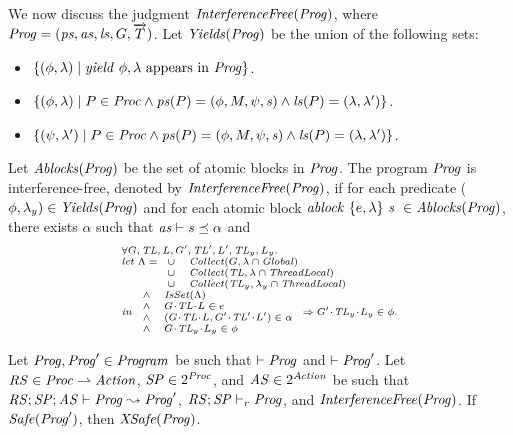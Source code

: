 We now discuss the judgment $\mathit{InterferenceFree}(\mathit{Prog})$,
where $\mathit{Prog} = (\mathit{ps}, \mathit{as}, \mathit{ls}, G, \overrightarrow{T})$. 
Let $\mathit{Yields}(\mathit{Prog})$ be the union of the following sets:
\begin{itemize}
\item
$\{(\phi,\lambda) \mid \mathit{yield}\ \phi,\lambda~\mathrm{appears~in~\mathit{Prog}}\}$.
\item
$\{(\phi,\lambda) \mid P \in \mathit{Proc} \wedge \mathit{ps}(P) = (\phi, M, \psi, \mathit{s}) \wedge \mathit{ls}(P) = (\lambda,\lambda')\}$.
\item
$\{(\psi,\lambda') \mid P \in \mathit{Proc} \wedge \mathit{ps}(P) = (\phi, M, \psi, \mathit{s}) \wedge \mathit{ls}(P) = (\lambda,\lambda')\}$.
\end{itemize}
Let $\mathit{Ablocks}(\mathit{Prog})$ be the set of atomic blocks in $\mathit{Prog}$.
The program $\mathit{Prog}$ is interference-free, denoted by $\mathit{InterferenceFree}(\mathit{Prog})$,
if for each predicate ($\phi,\lambda_y) \in \mathit{Yields}(\mathit{Prog})$ and 
for each atomic block $\mathit{ablock}\ {\{e,\lambda\}}\ {\mathit{s}}\  \in \mathit{Ablocks}(\mathit{Prog})$, there exists $\alpha$ such that 
$\mathit{as} \vdash \mathit{s} \preceq \alpha$ and 
\[
\scriptsize{
\begin{array}{l}
\forall \varsG,\varsTL,\varsL,\varsG',\varsTL',\varsL',\varsTL_y,\varsL_y.\\ 
\mathit{let}\ \Lambda =
\begin{array}[t]{ll}
\cup & \Collect(\varsG, \lins \cap \Global) \\
\cup & \Collect(\varsTL, \lins \cap \ThreadLocal) \\
\cup & \Collect(\varsTL_y, \lins_y \cap \ThreadLocal) 
\end{array} \\
\mathit{in}\
\begin{array}{ll}
\wedge & \IsSet(\Lambda) \\
\wedge & \MakeStore{\varsG}{\varsTL}{\varsL} \in e \\
\wedge & (\MakeStore{\varsG}{\varsTL}{\varsL}, \MakeStore{\varsG'}{\varsTL'}{\varsL'}) \in \alpha \\
\wedge & \MakeStore{\varsG}{\varsTL_y}{\varsL_y} \in \phi
\end{array}
\Rightarrow \MakeStore{\varsG'}{\varsTL_y}{\varsL_y} \in \phi.
\end{array}
}
\]

\begin{lemma}
Let $\mathit{Prog}, \mathit{Prog}' \in \mathit{Program}$ be such that $\vdash \mathit{Prog}$ and $\vdash \mathit{Prog}'$.
Let $\mathit{RS} \in \mathit{Proc} \rightharpoonup \mathit{Action}$, $\mathit{SP} \in 2^{\mathit{Proc}}$, and $\mathit{AS} \in 2^{\mathit{Action}}$
be such that $\mathit{RS};\mathit{SP};\mathit{AS} \vdash \mathit{Prog} \leadsto \mathit{Prog}'$, $\mathit{RS};\mathit{SP} \vdash_r \mathit{Prog}$, and
$\mathit{InterferenceFree}(\mathit{Prog})$.
If $\mathit{Safe}(\mathit{Prog}')$, then $\mathit{XSafe}(\mathit{Prog})$.
\end{lemma}

